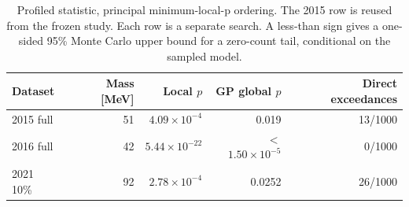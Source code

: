 \begin{table}[H]\centering\small
\begin{tabular}{lrrrr}\toprule
Dataset & Mass [MeV] & Local $p$ & GP global $p$ & Direct exceedances\\\midrule
2015 full & 51 & $4.09\times10^{-4}$ & 0.019 & 13/1000 \\
2016 full & 42 & $5.44\times10^{-22}$ & $<$$1.50\times10^{-5}$ & 0/1000 \\
2021 10\% & 92 & $2.78\times10^{-4}$ & 0.0252 & 26/1000 \\
\bottomrule\end{tabular}
\caption{Profiled statistic, principal minimum-local-p ordering. The 2015 row is reused from the frozen study. Each row is a separate search. A less-than sign gives a one-sided 95\% Monte Carlo upper bound for a zero-count tail, conditional on the sampled model.}\end{table}

